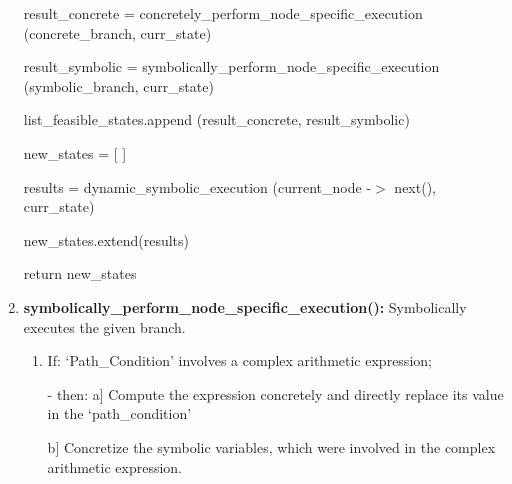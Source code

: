 \documentclass[11pt]{llncs}
\begin{document}
\begin{enumerate}
\begin{algorithm}[H]
{				                     result\_concrete = concretely\_perform\_node\_specific\_execution (concrete\_branch, curr\_state)
	
						\vspace{1mm}
		
				                     result\_symbolic = symbolically\_perform\_node\_specific\_execution (symbolic\_branch, curr\_state)
						
						\vspace{1mm}
				                     
				                     list\_feasible\_states.append (result\_concrete, result\_symbolic)
					}
		
					\vspace{3mm}
		
					 {
						\vspace{1mm}
	
					      new\_states = [ ]
	
						\vspace{1mm}
	
					        {
						results = dynamic\_symbolic\_execution (current\_node -$>$ next(), curr\_state)
	
						\vspace{1mm}
		
						new\_states.extend(results)
					      }\;
					
					      return new\_states
					}
					\;
				\end{algorithm}

				\vspace{2mm}

				\item \textbf{symbolically\_perform\_node\_specific\_execution():}  Symbolically executes the given branch.

					\begin{enumerate}
						\item If:  ‘Path\_Condition’ involves a complex arithmetic expression;

						           - then:  a] Compute the expression concretely and directly replace its value in the ‘path\_condition’

						                         \hspace{10mm} b] Concretize the symbolic variables, which were involved in the complex arithmetic expression.


\end{enumerate}
\end{enumerate}
\end{document}
